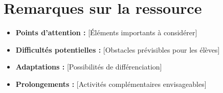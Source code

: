 \documentclass[11pt,a4paper]{article}
\begin{document}
\section{Remarques sur la ressource}
\begin{itemize}[leftmargin=*]
  \item \textbf{Points d'attention :} [Éléments importants à considérer]
  \item \textbf{Difficultés potentielles :} [Obstacles prévisibles pour les élèves]
  \item \textbf{Adaptations :} [Possibilités de différenciation]
  \item \textbf{Prolongements :} [Activités complémentaires envisageables]
\end{itemize}
\end{document}
